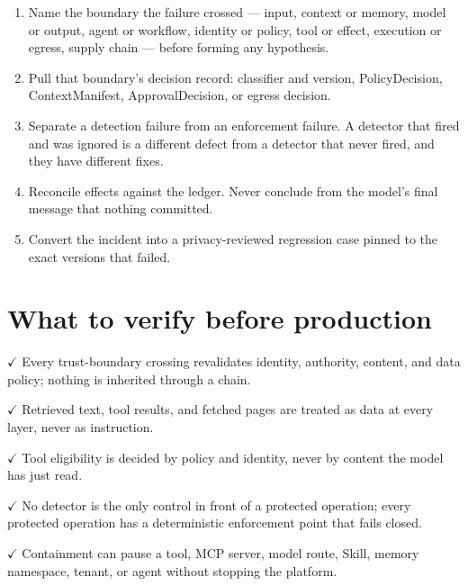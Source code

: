 \begin{enumerate}

\item Name the boundary the failure crossed — input, context or memory, model or output, agent or workflow, identity or policy, tool or effect, execution or egress, supply chain — before forming any hypothesis.

\item Pull that boundary's decision record: classifier and version, PolicyDecision, ContextManifest, ApprovalDecision, or egress decision.

\item Separate a detection failure from an enforcement failure. A detector that fired and was ignored is a different defect from a detector that never fired, and they have different fixes.

\item Reconcile effects against the ledger. Never conclude from the model's final message that nothing committed.

\item Convert the incident into a privacy-reviewed regression case pinned to the exact versions that failed.

\end{enumerate}

\section{What to verify before production}

\textbf{\ensuremath{\checkmark}} Every trust-boundary crossing revalidates identity, authority, content, and data policy; nothing is inherited through a chain.\par

\textbf{\ensuremath{\checkmark}} Retrieved text, tool results, and fetched pages are treated as data at every layer, never as instruction.\par

\textbf{\ensuremath{\checkmark}} Tool eligibility is decided by policy and identity, never by content the model has just read.\par

\textbf{\ensuremath{\checkmark}} No detector is the only control in front of a protected operation; every protected operation has a deterministic enforcement point that fails closed.\par

\textbf{\ensuremath{\checkmark}} Containment can pause a tool, MCP server, model route, Skill, memory namespace, tenant, or agent without stopping the platform.\par

